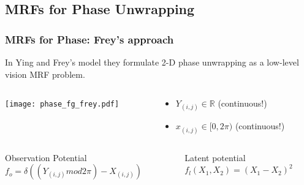 \documentclass[compress]{beamer}
\begin{document}
\subsection{MRFs for Phase Unwrapping}

\begin{frame} 
  \frametitle{MRFs for Phase: Frey's approach}
  In Ying and Frey's model \cite{lei_ying_unwrapping_2006} they formulate 2-D phase
  unwrapping as a low-level vision MRF problem. 
  
  \begin{columns}
    \begin{column}{5cm}
      \texttt{[image: phase\_fg\_frey.pdf]}
    \end{column}
    \begin{column}{5cm}
      \begin{itemize}
      \item $Y_{(i, j)} \in \mathbb{R}$ (continuous!) 
      \item $x_{(i, j)} \in [0, 2\pi)$ (continuous!) 
      \end{itemize}
    \end{column}
  \end{columns}
  
  
  \begin{columns}
    \begin{column}{5cm}
      \begin{block}{Observation Potential}
        $f_o = \delta ((Y_{(i, j)} mod 2\pi) - X_{(i, j)})$
      \end{block}
    \end{column}

    \begin{column}{5cm}
      \begin{block}{Latent potential} 
        $f_l(X_1, X_2) = (X_1 - X_2)^2$
      \end{block}
    \end{column}
    
  \end{columns}
  
\end{frame}
\end{document}
